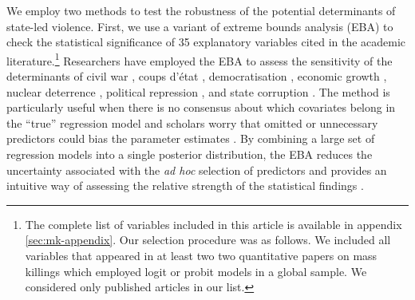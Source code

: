 We employ two methods to test the robustness of the potential determinants of state-led violence. First, we use a variant of extreme bounds analysis (EBA) to check the statistical significance of 35 explanatory variables cited in the academic literature.\footnote{The complete list of variables included in this article is available in appendix \ref{sec:mk-appendix}. Our selection procedure was as follows. We included all variables that appeared in at least two two quantitative papers on mass killings which employed logit or probit models in a global sample. We considered only published articles in our list.} Researchers have employed the EBA to assess the sensitivity of the determinants of civil war \citep{hegre2006sensitivity}, coups d'état \citep{gassebner2016expect}, democratisation \citep{gassebner2013extreme}, economic growth \citep{levine1992sensitivity, sala1997just, sturm2005determinants}, nuclear deterrence \citep{bell2015examining}, political repression \citep{hafner2005right}, and state corruption \citep{serra2006empirical}. The method is particularly useful when there is no consensus about which covariates belong in the ``true'' regression model \citep[178]{sala1997just} and scholars worry that omitted or unnecessary predictors could bias the parameter estimates \citep[60]{angrist2008mostly, clarke2005phantom, elwert2014endogenous, spector2011methodological}. By combining a large set of regression models into a single posterior distribution, the EBA reduces the uncertainty associated with the \textit{ad hoc} selection of predictors and provides an intuitive way of assessing the relative strength of the statistical findings \citep{leamer1985sensitivity, sala1997just}.

